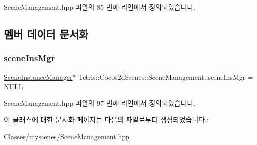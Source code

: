 Scene\+Management.\+hpp 파일의 85 번째 라인에서 정의되었습니다.



\subsection{멤버 데이터 문서화}
\mbox{\label{class_tetris_1_1_cocos2d_scenes_1_1_scene_management_a0ac07876072adcaefdcb86f9911475ba}} 
\subsubsection{\texorpdfstring{scene\+Ins\+Mgr}{sceneInsMgr}}
{\footnotesize\ttfamily \hyperlink{class_tetris_1_1_cocos2d_scenes_1_1_scene_instance_manager}{Scene\+Instance\+Manager}$\ast$ Tetris\+::\+Cocos2d\+Scenes\+::\+Scene\+Management\+::scene\+Ins\+Mgr = N\+U\+LL\hspace{0.3cm}{\ttfamily [protected]}}



Scene\+Management.\+hpp 파일의 97 번째 라인에서 정의되었습니다.



이 클래스에 대한 문서화 페이지는 다음의 파일로부터 생성되었습니다.\+:\begin{DoxyCompactItemize}
\item 
Classes/myscenes/\hyperlink{_scene_management_8hpp}{Scene\+Management.\+hpp}\end{DoxyCompactItemize}
